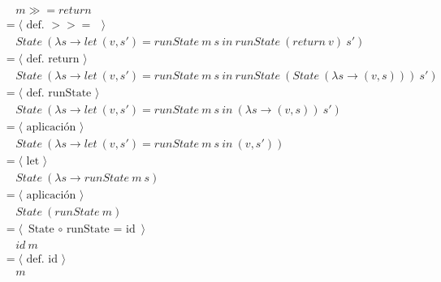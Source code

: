 \documentclass[a4paper,10pt]{article}
\begin{document}
	\\
	\begin{align*}
  	&\ \ \ \ \ m \gg= return
  	\\ &=\langle \text{ def. $>>=$ }\rangle
  	\\ &\ \ \ \ \ State\ (\lambda s \rightarrow let\ (v,s')=runState\ m\ s\ in\ runState\ (return\ v)\ s')
  	\\ &=\langle \text{ def. return }\rangle
  	\\ &\ \ \ \ \ State\ (\lambda s \rightarrow let\ (v,s')=runState\ m\ s\ in\ runState\ (State\ (\lambda s \rightarrow (v,s)))\ s')
  	\\ &=\langle \text{ def. runState }\rangle
	\\ &\ \ \ \ \ State\ (\lambda s \rightarrow let\ (v,s')=runState\ m\ s\ in\ (\lambda s \rightarrow (v,s))\ s')
  	\\ &=\langle \text{ aplicación }\rangle
	\\ &\ \ \ \ \ State\ (\lambda s \rightarrow let\ (v,s')=runState\ m\ s\ in\ (v,s'))
  	\\ &=\langle \text{ let }\rangle
	\\ &\ \ \ \ \ State\ (\lambda s \rightarrow runState\ m\ s)
  	\\ &=\langle \text{ aplicación }\rangle
  	\\ &\ \ \ \ \ State\ (runState\ m)
  	\\ &=\langle \text{ State $\circ$ runState = id }\rangle
  	\\ &\ \ \ \ \ id\ m
  	\\ &=\langle \text{ def. id }\rangle
  	\\ &\ \ \ \ \ m
  	\end{align*}
  	\pagebreak
	\\
	\\
\end{document}
